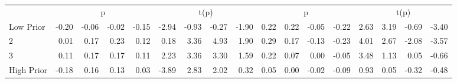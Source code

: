 \begin{table}[!ht]
\begin{tabular}{lrrrrrrrrrrrrrrrr}
  
     & \multicolumn{4}{c}{p} & \multicolumn{4}{c}{t(p)}  & \multicolumn{4}{c}{p} & \multicolumn{4}{c}{t(p)}   \\
     \cmidrule(r){2-5} \cmidrule(r){6-9}  \cmidrule(r){10-13} \cmidrule(r){14-17} 
    Low Prior  & -0.20  & -0.06  & -0.02  & -0.15  & -2.94  & -0.93  & -0.27  & -1.90  & 0.22  & 0.22  & -0.05  & -0.22  & 2.63  & 3.19  & -0.69  & -3.40   \\
    2  & 0.01  & 0.17  & 0.23  & 0.12  & 0.18  & 3.36  & 4.93  & 1.90  & 0.29  & 0.17  & -0.13  & -0.23  & 4.01  & 2.67  & -2.08  & -3.57   \\
    3  & 0.11  & 0.17  & 0.17  & 0.11  & 2.23  & 3.36  & 3.30  & 1.59  & 0.22  & 0.07  & 0.00  & -0.05  & 3.48  & 1.13  & 0.05  & -0.66   \\
    High Prior  & -0.18  & 0.16  & 0.13  & 0.03  & -3.89  & 2.83  & 2.02  & 0.32  & 0.05  & 0.00  & -0.02  & -0.09  & 0.93  & 0.05  & -0.32  & -0.48   \\
    
  
  \bottomrule
\end{tabular}
\label{tbl:32_Size_BMm_Prior_B16}
\end{table}